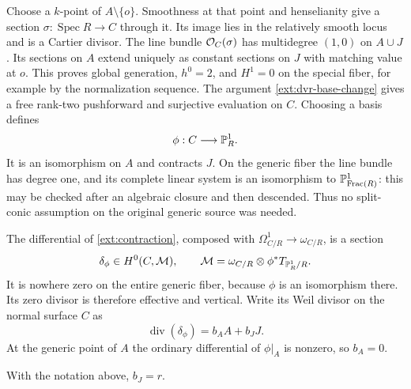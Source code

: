 Choose a $k$-point of $A\setminus\{o\}$. Smoothness at that point
and henselianity give a section $\sigma:\operatorname{Spec}R\to C$
through it. Its image lies in the relatively smooth locus and is a
Cartier divisor. The line bundle $\mathcal O_C(\sigma)$ has multidegree
$(1,0)$ on $A\cup J$. Its sections on $A$ extend uniquely as constant
sections on $J$ with matching value at $o$. This proves global
generation, $h^0=2$, and $H^1=0$ on the special fiber, for example
by the normalization sequence. The argument
\eqref{ext:dvr-base-change} gives a free rank-two pushforward and
surjective evaluation on $C$. Choosing a basis defines
\begin{equation}\label{ext:contraction}
\phi:C\longrightarrow\mathbb P^1_R.
\end{equation}
It is an isomorphism on $A$ and contracts $J$. On the generic fiber
the line bundle has degree one, and its complete linear system is
an isomorphism to $\mathbb P^1_{\operatorname{Frac}(R)}$: this may be
checked after an algebraic closure and then descended. Thus no
split-conic assumption on the original generic source was needed.

The differential of \eqref{ext:contraction}, composed with
$\Omega^1_{C/R}\to\omega_{C/R}$, is a section
\[
\delta_\phi\in H^0(C,\mathcal M),\qquad
\mathcal M=\omega_{C/R}\otimes\phi^*T_{\mathbb P^1_R/R}.
\]
It is nowhere zero on the entire generic fiber, because $\phi$ is
an isomorphism there. Its zero divisor is therefore effective and
vertical. Write its Weil divisor on the normal surface $C$ as
\begin{equation}\label{ext:differential-divisor}
\operatorname{div}(\delta_\phi)=b_AA+b_JJ.
\end{equation}
At the generic point of $A$ the ordinary differential of $\phi|_A$
is nonzero, so $b_A=0$.

\begin{lemma}
\label{ext:differential-order}
With the notation above, $b_J=r$.
\end{lemma}

